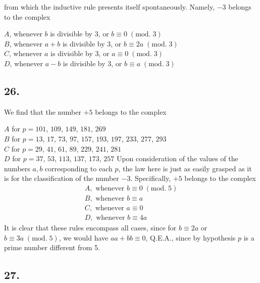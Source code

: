 \documentclass[twoside,12pt]{memoir}
\renewenvironment{quote}%
  {\list{}{\leftmargin=5em\rightmargin=0em}\item[]}%
  {\endlist}
\renewcommand{\pmod}[1]{\;(\textrm{mod.}\;#1)}
\begin{document}
from which the inductive rule presents itself spontaneously. Namely, \(-3\) belongs to the complex
\begin{quote}
\(A\), whenever \(b\) is divisible by 3, or \(b \equiv 0\pmod{3}\)\\
\(B\), whenever \(a+b\) is divisible by 3, or \(b \equiv 2 a\pmod{3}\)\\
\(C\), whenever \(a\) is divisible by 3, or \(a \equiv 0\pmod{3}\)\\
\(D\), whenever \(a-b\) is divisible by 3, or \(b \equiv a\pmod{3}\)
\end{quote}

\subsection*{26.}

We find that the number \(+5\) belongs to the complex
\begin{quote}
\(A\) for \(p=101\), \(109\), \(149\), \(181\), \(269\) \\
\(B\) for \(p=13\), \(17\), \(73\), \(97\), \(157\), \(193\), \(197\), \(233\), \(277\), \(293\) \\
\(C\) for \(p=29\), \(41\), \(61\), \(89\), \(229\), \(241\), \(281\) \\
\(D\) for \(p=37\), \(53\), \(113\), \(137\), \(173\), \(257\)\end{quote}
Upon consideration of the values of the numbers \(a, b\) corresponding to each \(p\), the law here is just as easily grasped as it is for the classification of the number \(-3\). Specifically, \(+5\) belongs to the complex\pagebreak%
\[\begin{array}{l}
A, \text{ whenever } b \equiv 0\pmod{5} \\
B, \text{ whenever } b \equiv a \\
C, \text{ whenever } a \equiv 0 \\
D, \text{ whenever } b \equiv 4 a
\end{array}\]
It is clear that these rules encompass all cases, since for \(b \equiv 2 a\) or \(b \equiv 3 a\pmod{5}\), we would have \(a a+b b \equiv 0\), Q.E.A., since by hypothesis \(p\) is a prime number different from 5.

\subsection*{27.}
\end{document}
